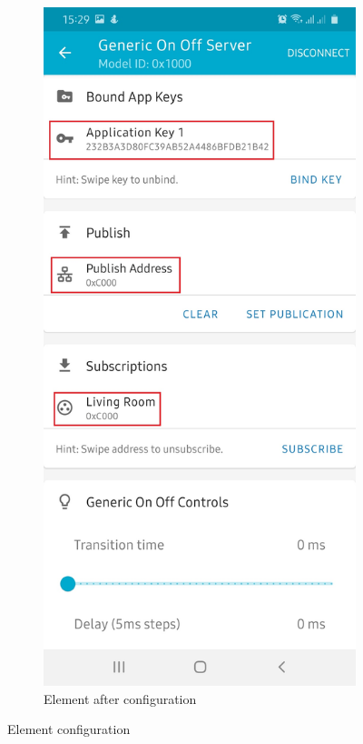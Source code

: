 \documentclass[\main/main.tex]{subfiles}
\begin{document}
\begin{figure}[H]
\begin{subfigure}[b]{0.4\linewidth}
        \includegraphics[width=0.7\linewidth]{nRF_Mesh_07.jpg}
        \caption{Element after configuration}
    \end{subfigure}
    \caption{Element configuration}
    \label{fig:element_configuration}
\end{figure}

\bib
\end{document}
